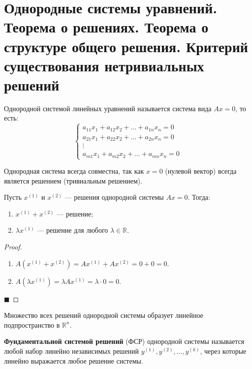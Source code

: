 \section{Однородные системы уравнений. Теорема о решениях. Теорема о структуре общего решения. Критерий существования нетривиальных решений}

\begin{definition}
Однородной системой линейных уравнений называется система вида $Ax = 0$, то есть:
\[
\begin{cases}
a_{11}x_1 + a_{12}x_2 + \ldots + a_{1n}x_n = 0 \\
a_{21}x_1 + a_{22}x_2 + \ldots + a_{2n}x_n = 0 \\
\vdots \\
a_{m1}x_1 + a_{m2}x_2 + \ldots + a_{mn}x_n = 0
\end{cases}
\]
\end{definition}

\begin{remark}
Однородная система всегда совместна, так как $x = 0$ (нулевой вектор) всегда является решением (тривиальным решением).
\end{remark}

\begin{theorem}
Пусть $x^{(1)}$ и $x^{(2)}$ --- решения однородной системы $Ax = 0$. Тогда:
\begin{enumerate}
    \item $x^{(1)} + x^{(2)}$ --- решение;
    \item $\lambda x^{(1)}$ --- решение для любого $\lambda \in \mathbb{R}$.
\end{enumerate}
\end{theorem}

\begin{proof}
\begin{enumerate}
    \item $A(x^{(1)} + x^{(2)}) = Ax^{(1)} + Ax^{(2)} = 0 + 0 = 0$.
    \item $A(\lambda x^{(1)}) = \lambda Ax^{(1)} = \lambda \cdot 0 = 0$.
\end{enumerate}
\hfill$\blacksquare$
\end{proof}

\begin{corollary}
Множество всех решений однородной системы образует линейное подпространство в $\mathbb{R}^n$.
\end{corollary}

\begin{definition}
\textbf{Фундаментальной системой решений} (ФСР) однородной системы называется любой набор линейно независимых решений $y^{(1)}, y^{(2)}, \ldots, y^{(k)}$, через которые линейно выражается любое решение системы.
\end{definition}

